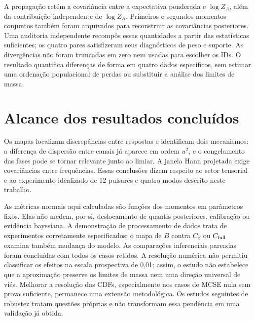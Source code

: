A propagação retém a covariância entre a expectativa ponderada e
$\log Z_A$, além da contribuição independente de $\log Z_B$.
Primeiros e segundos momentos conjuntos também foram arquivados para
reconstruir as covariâncias posteriores. Uma auditoria independente
recompôs essas quantidades a partir das estatísticas suficientes;
os quatro pares satisfizeram seus diagnósticos de peso e suporte.
As divergências não foram truncadas em zero nem usadas para escolher
os IDs. O resultado quantifica diferenças de forma em quatro dados
específicos, sem estimar uma ordenação populacional de perdas ou
substituir a análise dos limites de massa.

\section{Alcance dos resultados concluídos}

Os mapas localizam discrepâncias entre respostas e identificam dois
mecanismos: a diferença de dispersão entre canais já aparece em ordem
$u^2$, e o congelamento das fases pode se tornar relevante junto ao limiar.
A janela Hann projetada exige covariâncias entre frequências. Essas
conclusões dizem respeito ao setor tensorial e ao experimento idealizado
de 12 pulsares e quatro modos descrito neste trabalho.

As métricas normais aqui calculadas são funções dos momentos em parâmetros
fixos. Elas não medem, por si, deslocamento de quantis posteriores,
calibração ou evidência bayesiana. A demonstração de processamento de dados
trata de experimentos corretamente especificados; o mapa de $B$ contra
$C_\beta$ ou $C_{\rm full}$ examina também mudança do modelo.
As comparações inferenciais pareadas foram concluídas com todos os
casos retidos. A resolução numérica não permitiu classificar os efeitos
na escala prospectiva de 0,01; assim, o estudo não estabelece que a
aproximação preserve os limites de massa nem uma direção universal de
viés. Melhorar a resolução das CDFs, especialmente nos casos de MCSE
nula sem prova suficiente, permanece uma extensão metodológica.
Os estudos seguintes de robustez tratam questões próprias e não
transformam essa pendência em uma validação já obtida.
